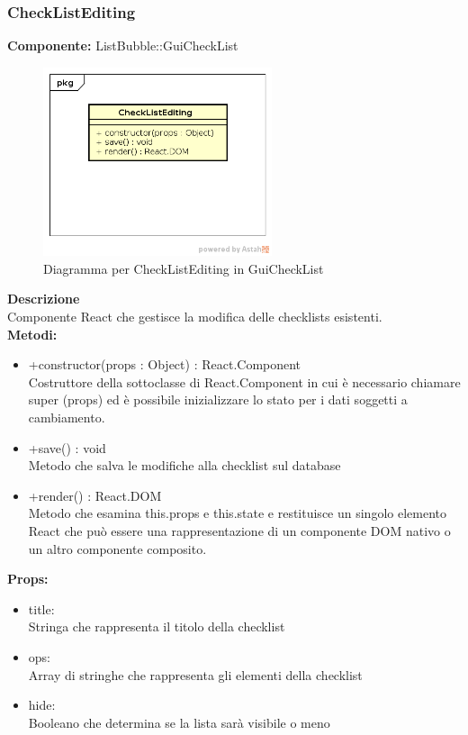 \subsubsection{CheckListEditing}
\textbf{Componente:}  ListBubble::GuiCheckList\\
   \FloatBarrier
   \begin{figure}[ht]
   \centering
   \includegraphics[width=0.6\textwidth]{img/single-CheckListEditing.png}
   \caption{{Diagramma per CheckListEditing in GuiCheckList}}
\end{figure}
\FloatBarrier
\textbf{Descrizione}\\
Componente React che gestisce la modifica delle checklists esistenti. \\
\textbf{Metodi:} 
\begin{itemize}

\item +constructor(props : Object) : React.Component 
\\
Costruttore della sottoclasse di React.Component in cui è necessario chiamare super (props) ed è possibile inizializzare lo stato per i dati soggetti a cambiamento.

\item +save() : void  
\\
Metodo che salva le modifiche alla checklist sul database

\item +render() : React.DOM 
\\
Metodo che esamina this.props e this.state e restituisce un singolo elemento React che può essere una rappresentazione di un componente DOM nativo o un altro componente composito.

\end{itemize}

\textbf{Props:} 
\begin{itemize}

\item title: 
\\
Stringa che rappresenta il titolo della checklist
\item ops:
\\
Array di stringhe che rappresenta gli elementi della checklist
\item hide:
\\
Booleano che determina se la lista sarà visibile o meno

\end{itemize} 


